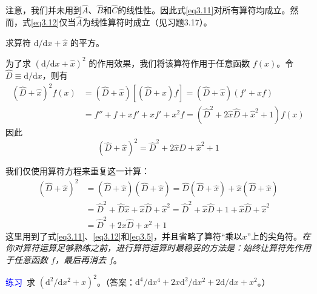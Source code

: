 \documentclass[12pt,a4paper,openany]{ctexbook}
\begin{document}
\begin{flushleft}
\begin{examplebox}
注意，我们并未用到$\hat{A}$、$\hat{B}$和$\hat{C}$的线性性。因此式\eqref{eq3.11}对所有算符均成立。然而，式\eqref{eq3.12}仅当$\hat{A}$为线性算符时成立（见习题3.17）。
\end{examplebox}

\begin{examplebox}
    \setlength{\parindent}{2em}
求算符 \(\mathrm{d}/\mathrm{d}x + \hat{x}\) 的平方。

为了求 \((\mathrm{d}/\mathrm{d}x + \hat{x})^2\) 的作用效果，我们将该算符作用于任意函数 \(f(x)\)。令 \(\hat{D} \equiv \mathrm{d}/\mathrm{d}x\)，则有
\[
\begin{aligned}
(\hat{D} + \hat{x})^2 f(x) &= (\hat{D} + \hat{x})[(\hat{D} + x)f] = (\hat{D} + \hat{x})(f' + xf) \\
&= f'' + f + xf' + xf' + x^2 f = (\hat{D}^2 + 2\hat{x}\hat{D} + \hat{x}^2 + 1)f(x)
\end{aligned}
\]
因此
\[
(\hat{D} + \hat{x})^2 = \hat{D}^2 + 2\hat{x}\hat{D} + \hat{x}^2 + 1
\]

我们仅使用算符方程来重复这一计算：
\[
\begin{aligned}
(\hat{D} + \hat{x})^2 &= (\hat{D} + \hat{x})(\hat{D} + \hat{x}) = \hat{D}(\hat{D} + \hat{x}) + \hat{x}(\hat{D} + \hat{x}) \\
&= \hat{D}^2 + \hat{D}\hat{x} + \hat{x}\hat{D} + \hat{x}^2 = \hat{D}^2 + \hat{x}\hat{D} + 1 + \hat{x}\hat{D} + \hat{x}^2 \\
&= \hat{D}^2 + 2x\hat{D} + x^2 + 1
\end{aligned}
\]
这里用到了式\eqref{eq3.11}、\eqref{eq3.12}和\eqref{eq3.5}，并且省略了算符“乘以\(x\)”上的尖角符。\textit{在你对算符运算足够熟练之前，进行算符运算时最稳妥的方法是：始终让算符先作用于任意函数 \(f\)，最后再消去 \(f\)}。

\textcolor{blue}{\large 练习}\ 求 \((\mathrm{d}^2/\mathrm{d}x^2 + x)^2\)。（答案：\(\mathrm{d}^4/\mathrm{d}x^4 + 2x\mathrm{d}^2/\mathrm{d}x^2 + 2\mathrm{d}/\mathrm{d}x + x^2\)。）
\end{examplebox}
\end{flushleft}
\end{document}
